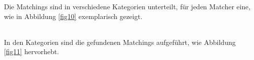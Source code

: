 		Die Matchings sind in verschiedene Kategorien unterteilt, für
		jeden Matcher eine, wie in Abbildung \ref{fig10} exemplarisch gezeigt.\\
		\begin{minipage}{\linewidth}
			\label{fig10}  
		\end{minipage}
		\\
		In den Kategorien sind die gefundenen Matchings aufgeführt, wie Abbildung
		\ref{fig11} hervorhebt.\\
		\begin{minipage}{\linewidth}
			\label{fig11}
		\end{minipage}
		
		\pagebreak[4]
		
